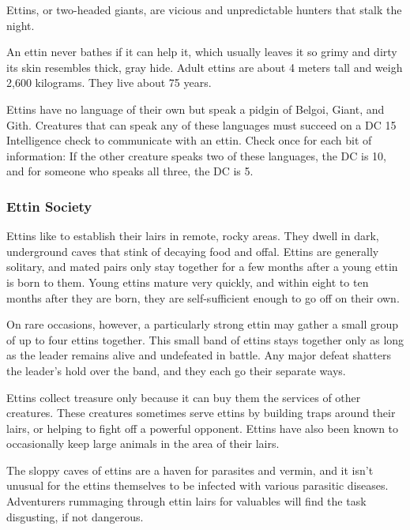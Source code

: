 Ettins, or two-headed giants, are vicious and unpredictable hunters that stalk the night.

An ettin never bathes if it can help it, which usually leaves it so grimy and dirty its skin resembles thick, gray hide. Adult ettins are about 4 meters tall and weigh 2,600 kilograms. They live about 75 years.

Ettins have no language of their own but speak a pidgin of Belgoi, Giant, and Gith. Creatures that can speak any of these languages must succeed on a DC 15 Intelligence check to communicate with an ettin. Check once for each bit of information: If the other creature speaks two of these languages, the DC is 10, and for someone who speaks all three, the DC is 5.

\subsubsection{Ettin Society}
Ettins like to establish their lairs in remote, rocky areas. They dwell in dark, underground caves that stink of decaying food and offal. Ettins are generally solitary, and mated pairs only stay together for a few months after a young ettin is born to them. Young ettins mature very quickly, and within eight to ten months after they are born, they are self-sufficient enough to go off on their own.

On rare occasions, however, a particularly strong ettin may gather a small group of up to four ettins together. This small band of ettins stays together only as long as the leader remains alive and undefeated in battle. Any major defeat shatters the leader's hold over the band, and they each go their separate ways.

Ettins collect treasure only because it can buy them the services of other creatures. These creatures sometimes serve ettins by building traps around their lairs, or helping to fight off a powerful opponent. Ettins have also been known to occasionally keep large animals in the area of their lairs.

The sloppy caves of ettins are a haven for parasites and vermin, and it isn't unusual for the ettins themselves to be infected with various parasitic diseases. Adventurers rummaging through ettin lairs for valuables will find the task disgusting, if not dangerous.

